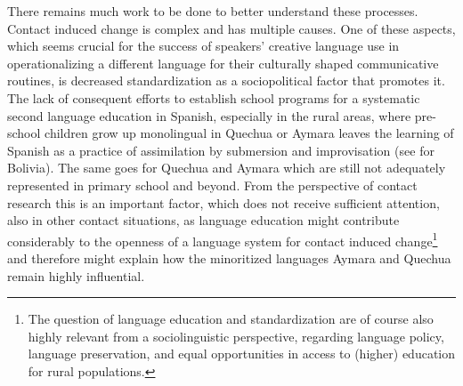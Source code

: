 \documentclass[output=paper,hidelinks]{langscibook}
\begin{document}
There remains much work to be done to better understand these processes. Contact induced change is complex and has multiple causes. One of these aspects, which seems crucial for the success of speakers’ creative language use in operationalizing a different language for their culturally shaped communicative routines, is decreased standardization as a sociopolitical factor that promotes it. The lack of consequent efforts to establish school programs for a systematic second language education in Spanish, especially in the rural areas, where pre-school children grow up monolingual in Quechua or Aymara leaves the learning of Spanish as a practice of assimilation by submersion and improvisation (see \cite{SRodriguez2006} for Bolivia). The same goes for Quechua and Aymara which are still not adequately represented in primary school and beyond. From the perspective of contact research this is an important factor, which does not receive sufficient attention, also in other contact situations, as language education might contribute considerably to the openness of a language system for contact induced change\footnote{The question of language education and standardization are of course also highly relevant from a sociolinguistic perspective, regarding language policy, language preservation, and equal opportunities in access to (higher) education for rural populations.} and therefore might explain how the minoritized languages Aymara and Quechua remain highly influential.

\sloppy
\printbibliography[heading=subbibliography,notkeyword=this]
\end{document}
